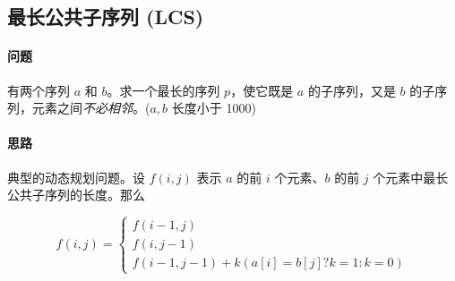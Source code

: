 \subsection{最长公共子序列 (LCS)}
	\paragraph{问题} 有两个序列 $a$ 和 $b$。求一个最长的序列 $p$，使它既是 $a$ 的子序列，又是 $b$ 的子序列，元素之间\emph{不必相邻}。($a,b$ 长度小于 1000)
	
	\paragraph{思路} 典型的动态规划问题。设 $f(i,j)$ 表示 $a$ 的前 $i$ 个元素、$b$ 的前 $j$ 个元素中最长公共子序列的长度。那么
	
	\[
		f(i,j)=\left\{{\begin{array}{l}f(i-1,j)\\f(i,j-1)\\f(i-1,j-1)+k(a[i]=b[j]?k=1:k=0)\end{array}}\right.
	\]
	
	